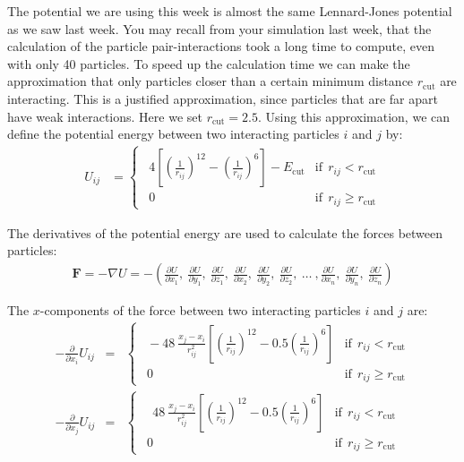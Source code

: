 \documentclass{article}
\begin{document}
The potential we are using this week is almost the same Lennard-Jones potential as we saw last week.
You may recall from your simulation last week, that the calculation of the particle pair-interactions took a long time to compute, even with only 40 particles.
%
To speed up the calculation time we can make the approximation that only particles closer than a certain minimum distance $r_{\mathrm{cut}}$ are interacting.
This is a justified approximation, since particles that are far apart have weak interactions.
Here we set $r_{\mathrm{cut}} = 2.5$.
Using this approximation, we can define the potential energy between two interacting particles $i$ and $j$ by:
%
\begin{align}
    U_{ij} &= 
    \begin{cases}
        \ \ 4 \left[ \left(\frac{1}{r_{ij}} \right)^{12} - \left(\frac{1}{r_{ij}} \right)^6 \right] -E_{\mathrm{cut}} & \mathrm{if}\ \ r_{ij} < r_{\mathrm{cut}}\\
        \ \ 0 & \mathrm{if}\ \ r_{ij} \ge  r_{\mathrm{cut}}
    \end{cases}
\end{align}

The derivatives of the potential energy are used to calculate the forces between particles:
\begin{align}
    \mathbf{F} = -\nabla U =
    -\left(
        \frac{\partial U}{\partial x_1},\
        \frac{\partial U}{\partial y_1},\
        \frac{\partial U}{\partial z_1},\
        \frac{\partial U}{\partial x_2},\
        \frac{\partial U}{\partial y_2},\
        \frac{\partial U}{\partial z_2},\
        \ldots\ ,
        \frac{\partial U}{\partial x_n},\
        \frac{\partial U}{\partial y_n},\
        \frac{\partial U}{\partial z_n}
    \right)
\end{align}

The $x$-components of the force between two interacting particles $i$ and $j$ are:
\begin{eqnarray}
    -\frac{\partial}{\partial x_i} U_{ij}&=& 
    \begin{cases}
        \ \ -48\ \frac{x_j - x_i}{r^2_{ij}}
        \left[ \left(\frac{1}{r_{ij}} \right)^{12} - 0.5 \left(\frac{1}{r_{ij}} \right)^6 \right]
        & \mathrm{if}\ \ r_{ij} < r_{\mathrm{cut}} \\
        \ \ 0 & \mathrm{if}\ \ r_{ij} \ge  r_{\mathrm{cut}}
    \end{cases}\label{eq:force_i}\\
    -\frac{\partial}{\partial x_j} U_{ij}&=&
    \begin{cases}
        \ \ \ \ 48\ \frac{x_j - x_i}{r^2_{ij}}
        \left[ \left(\frac{1}{r_{ij}} \right)^{12} - 0.5 \left(\frac{1}{r_{ij}} \right)^6 \right]
        & \mathrm{if}\ \ r_{ij} < r_{\mathrm{cut}} \\
        \ \ 0 & \mathrm{if}\ \ r_{ij} \ge  r_{\mathrm{cut}}
    \end{cases}\label{eq:force_j}
\end{eqnarray}
\end{document}
